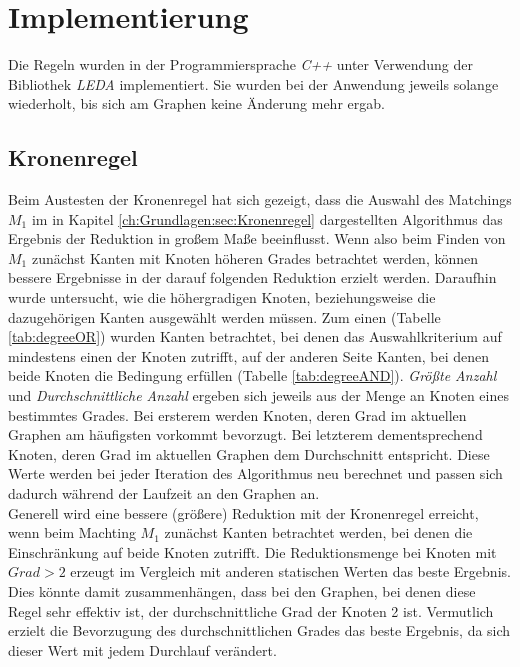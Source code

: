
\chapter{Implementierung}
\label{ch:Implementierung}


Die Regeln wurden in der Programmiersprache \emph{C++} unter Verwendung der Bibliothek \emph{LEDA} \cite{manual} implementiert. Sie wurden bei der Anwendung jeweils solange wiederholt, bis sich am Graphen keine Änderung mehr ergab. 

\section{Kronenregel}
\label{ch:Implementierung:sec:Kronenregel}

Beim Austesten der Kronenregel hat sich gezeigt, dass die Auswahl des Matchings $M_{1}$ im in Kapitel \ref{ch:Grundlagen:sec:Kronenregel} dargestellten Algorithmus das Ergebnis der Reduktion in großem Maße beeinflusst. Wenn also beim Finden von $M_{1}$ zunächst Kanten mit Knoten höheren Grades betrachtet werden, können bessere Ergebnisse in der darauf folgenden Reduktion erzielt werden. Daraufhin wurde untersucht, wie die höhergradigen Knoten, beziehungsweise die dazugehörigen Kanten ausgewählt werden müssen. Zum einen (Tabelle \ref{tab:degreeOR}) wurden Kanten betrachtet, bei denen das Auswahlkriterium auf mindestens einen der Knoten zutrifft, auf der anderen Seite Kanten, bei denen beide Knoten die Bedingung erfüllen (Tabelle \ref{tab:degreeAND}). \emph{Größte Anzahl} und \emph{Durchschnittliche Anzahl} ergeben sich jeweils aus der Menge an Knoten eines bestimmtes Grades. Bei ersterem werden Knoten, deren Grad im aktuellen Graphen am häufigsten vorkommt bevorzugt. Bei letzterem dementsprechend Knoten, deren Grad im aktuellen Graphen dem Durchschnitt entspricht. Diese Werte werden bei jeder Iteration des Algorithmus neu berechnet und passen sich dadurch während der Laufzeit an den Graphen an.\\ 
Generell wird eine bessere (größere) Reduktion mit der Kronenregel erreicht, wenn beim Machting $M_{1}$ zunächst Kanten betrachtet werden, bei denen die Einschränkung auf beide Knoten zutrifft. Die Reduktionsmenge bei Knoten mit $Grad>2$ erzeugt im Vergleich mit anderen statischen Werten das beste Ergebnis. Dies könnte damit zusammenhängen, dass bei den Graphen, bei denen diese Regel sehr effektiv ist, der durchschnittliche Grad der Knoten 2 ist. Vermutlich erzielt die Bevorzugung des durchschnittlichen Grades das beste Ergebnis, da sich dieser Wert mit jedem Durchlauf verändert.



